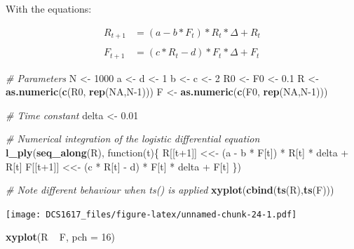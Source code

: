 \documentclass[]{book}
\newenvironment{Shaded}{\begin{snugshade}}{\end{snugshade}}
\newcommand{\KeywordTok}[1]{\textcolor[rgb]{0.13,0.29,0.53}{\textbf{{#1}}}}
\newcommand{\DataTypeTok}[1]{\textcolor[rgb]{0.13,0.29,0.53}{{#1}}}
\newcommand{\DecValTok}[1]{\textcolor[rgb]{0.00,0.00,0.81}{{#1}}}
\newcommand{\FloatTok}[1]{\textcolor[rgb]{0.00,0.00,0.81}{{#1}}}
\newcommand{\StringTok}[1]{\textcolor[rgb]{0.31,0.60,0.02}{{#1}}}
\newcommand{\CommentTok}[1]{\textcolor[rgb]{0.56,0.35,0.01}{\textit{{#1}}}}
\newcommand{\OtherTok}[1]{\textcolor[rgb]{0.56,0.35,0.01}{{#1}}}
\newcommand{\NormalTok}[1]{{#1}}
\begin{document}
With the equations:

\begin{align}
R_{t+1} &=  (a-b*F_t)*R_t * \Delta + R_t \\
\\
F_{t+1} &=  (c*R_t-d)*F_t * \Delta + F_t
\end{align}

\begin{Shaded}
\begin{Highlighting}[]
\CommentTok{# Parameters}
\NormalTok{N  <-}\StringTok{ }\DecValTok{1000}
\NormalTok{a  <-}\StringTok{ }\NormalTok{d <-}\StringTok{ }\DecValTok{1}
\NormalTok{b  <-}\StringTok{ }\NormalTok{c <-}\StringTok{ }\DecValTok{2} 
\NormalTok{R0 <-}\StringTok{ }\NormalTok{F0 <-}\StringTok{ }\FloatTok{0.1}
\NormalTok{R  <-}\StringTok{ }\KeywordTok{as.numeric}\NormalTok{(}\KeywordTok{c}\NormalTok{(R0, }\KeywordTok{rep}\NormalTok{(}\OtherTok{NA}\NormalTok{,N}\DecValTok{-1}\NormalTok{)))}
\NormalTok{F  <-}\StringTok{ }\KeywordTok{as.numeric}\NormalTok{(}\KeywordTok{c}\NormalTok{(F0, }\KeywordTok{rep}\NormalTok{(}\OtherTok{NA}\NormalTok{,N}\DecValTok{-1}\NormalTok{)))}

\CommentTok{# Time constant}
\NormalTok{delta <-}\StringTok{ }\FloatTok{0.01}

\CommentTok{# Numerical integration of the logistic differential equation}
\KeywordTok{l_ply}\NormalTok{(}\KeywordTok{seq_along}\NormalTok{(R), function(t)\{}
    \NormalTok{R[[t}\DecValTok{+1}\NormalTok{]] <<-}\StringTok{ }\NormalTok{(a -}\StringTok{ }\NormalTok{b *}\StringTok{ }\NormalTok{F[t]) *}\StringTok{ }\NormalTok{R[t] *}\StringTok{ }\NormalTok{delta +}\StringTok{ }\NormalTok{R[t] }
    \NormalTok{F[[t}\DecValTok{+1}\NormalTok{]] <<-}\StringTok{ }\NormalTok{(c *}\StringTok{ }\NormalTok{R[t] -}\StringTok{ }\NormalTok{d) *}\StringTok{ }\NormalTok{F[t] *}\StringTok{ }\NormalTok{delta +}\StringTok{ }\NormalTok{F[t] }
    \NormalTok{\})}

\CommentTok{# Note different behaviour when ts() is applied}
\KeywordTok{xyplot}\NormalTok{(}\KeywordTok{cbind}\NormalTok{(}\KeywordTok{ts}\NormalTok{(R),}\KeywordTok{ts}\NormalTok{(F)))}
\end{Highlighting}
\end{Shaded}

\texttt{[image: DCS1617\_files/figure-latex/unnamed-chunk-24-1.pdf]}

\begin{Shaded}
\begin{Highlighting}[]
\KeywordTok{xyplot}\NormalTok{(R ~}\StringTok{ }\NormalTok{F, }\DataTypeTok{pch =} \DecValTok{16}\NormalTok{)}
\end{Highlighting}
\end{Shaded}
\end{document}
